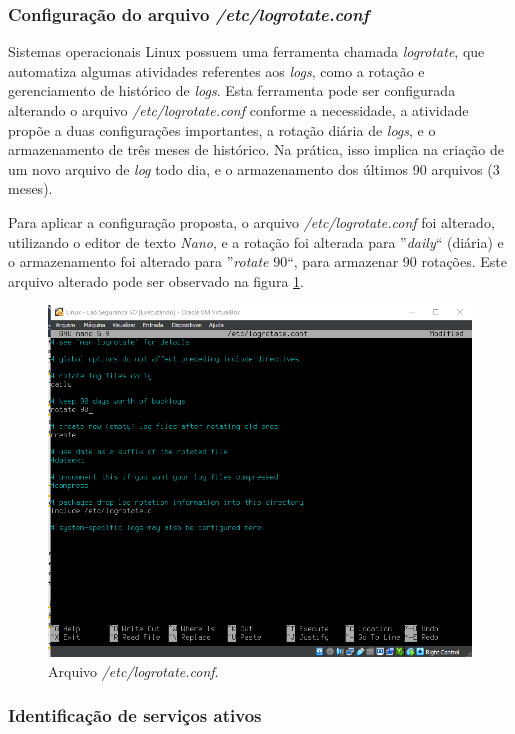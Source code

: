 \documentclass[
  12pt,				%
  oneside,   	        %
  a4paper,			%
  english,			%
  french,				%
  spanish,			%
  brazil,				%
  ]{pacotes/abntex2}
\begin{document}
\subsubsection{Configuração do arquivo \textit{/etc/logrotate.conf}}
Sistemas operacionais Linux possuem uma ferramenta chamada \textit{logrotate}, que automatiza algumas atividades referentes aos \textit{logs}, como a rotação e gerenciamento de histórico de \textit{logs}. Esta ferramenta pode ser configurada alterando o arquivo \textit{/etc/logrotate.conf} conforme a necessidade, a atividade propõe a duas configurações importantes, a rotação diária de \textit{logs}, e o armazenamento de três meses de histórico. Na prática, isso implica na criação de um novo arquivo de \textit{log} todo dia, e o armazenamento dos últimos 90 arquivos (3 meses).

Para aplicar a configuração proposta, o arquivo \textit{/etc/logrotate.conf} foi alterado, utilizando o editor de texto \textit{Nano}, e a rotação foi alterada para ''\textit{daily}`` (diária) e o armazenamento foi alterado para ''\textit{rotate} 90``, para armazenar 90 rotações. Este arquivo alterado pode ser observado na figura \ref{fig:logrotate}.

\begin{figure}[H]
  \centering
  \includegraphics[scale=0.7]{figuras/logrotate.png}
  \caption{Arquivo \textit{/etc/logrotate.conf}.}
  \label{fig:logrotate}
\end{figure}

\subsubsection{Identificação de serviços ativos}
\end{document}
